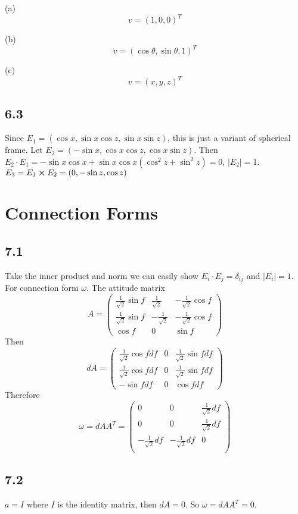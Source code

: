 \documentclass[12pt]{article}
\begin{document}
(a) $$ v = (1, 0, 0)^T$$

(b) $$ v = (\cos \theta, \sin \theta, 1)^T $$

(c) $$ v = (x, y, z)^T$$

\subsection*{6.3}
Since $ E_1 = (\cos x, \sin x \cos z, \sin x \sin z)$, this is just a variant of spherical frame. Let $E_2 = (-\sin x, \cos x \cos z, \cos x \sin z)$. Then $E_2 \cdot E_1 = -\sin x \cos x + \sin x \cos x(\cos^2 z + \sin^2 z) = 0$, $|E_2| = 1$. $E_3 = E_1 \cross E_2 = (0, -\sin z, \cos z)$ \QED


\section{Connection Forms}

\subsection*{7.1}
Take the inner product and norm we can easily show $E_i \cdot E_j = \delta_{ij}$ and $|E_i| = 1$. For connection form $\omega$. The attitude matrix 
$$ A = \begin{pmatrix}
	\frac{1}{\sqrt{2}}\sin f & 	\frac{1}{\sqrt{2}} & -	\frac{1}{\sqrt{2}}\cos f \\
		\frac{1}{\sqrt{2}}\sin f & - \frac{1}{\sqrt{2}} & -	\frac{1}{\sqrt{2}}\cos f \\
		\cos f & 0 & \sin f
\end{pmatrix}$$
Then $$dA = \begin{pmatrix}
		\frac{1}{\sqrt{2}} \cos f df  & 0 & 	\frac{1}{\sqrt{2}} \sin f df \\
			\frac{1}{\sqrt{2}} \cos f df & 0  & 	\frac{1}{\sqrt{2}} \sin f df \\
			-\sin f df & 0 & \cos f df
\end{pmatrix} $$
Therefore 
$$\omega = dA A^T = \begin{pmatrix}
	0 & 0 & 	\frac{1}{\sqrt{2}} df \\
	0 & 0 & 	\frac{1}{\sqrt{2}} df \\
	- 	\frac{1}{\sqrt{2}} df & - 	\frac{1}{\sqrt{2}} df & 0 \\
\end{pmatrix}$$

\subsection*{7.2}
$a = I$ where $I$ is the identity matrix, then $dA = 0$. So $\omega = dA A^T = 0$.
\end{document}

